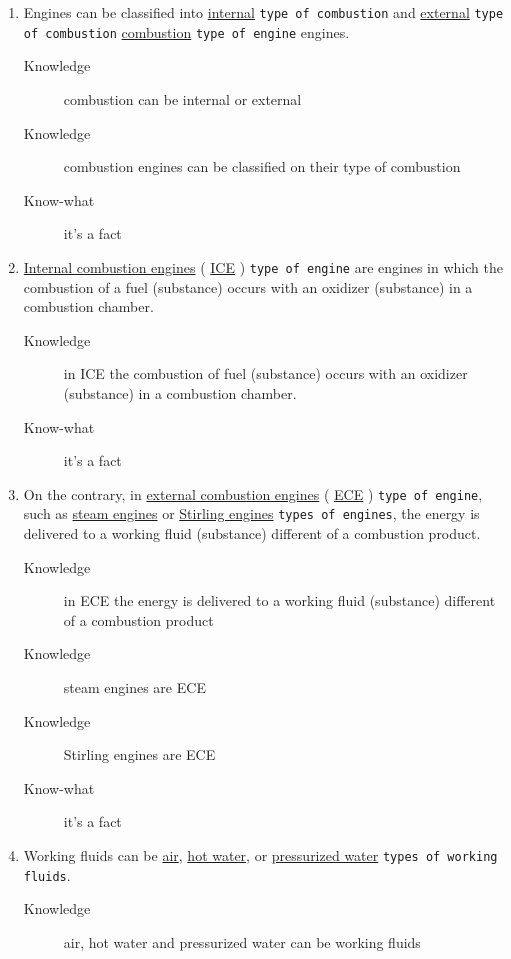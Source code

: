 \documentclass[a4paper,10pt,twoside,twocolumn]{article}
\begin{document}
\begin{enumerate}
\item Engines can be classified into \uline{internal} \texttt{type of combustion} and \uline{external} \texttt{type of combustion} \uline{combustion} \texttt{type of engine} engines.
\begin{description}
\item[{Knowledge}] combustion can be internal or external
\item[{Knowledge}] combustion engines can be classified on their type of combustion
\item[{Know-what}] it's a fact
\end{description}
\item \uline{Internal combustion engines} ( \uline{ICE} ) \texttt{type of engine} are engines in which the combustion of a fuel (substance) occurs with an oxidizer (substance) in a combustion chamber.
\begin{description}
\item[{Knowledge}] in ICE the combustion of fuel (substance) occurs with an oxidizer (substance) in a combustion chamber.
\item[{Know-what}] it's a fact
\end{description}
\item On the contrary, in \uline{external combustion engines} ( \uline{ECE} ) \texttt{type of engine}, such as \uline{steam engines} or \uline{Stirling engines} \texttt{types of engines}, the energy is delivered to a working fluid (substance) different of a combustion product.
\begin{description}
\item[{Knowledge}] in ECE the energy is delivered to a working fluid (substance) different of a combustion product
\item[{Knowledge}] steam engines are ECE
\item[{Knowledge}] Stirling engines are ECE
\item[{Know-what}] it's a fact
\end{description}
\item Working fluids can be \uline{air}, \uline{hot water}, or \uline{pressurized water} \texttt{types of working fluids}.
\begin{description}
\item[{Knowledge}] air, hot water and pressurized water can be working fluids
\end{description}
\end{enumerate}
\end{document}
